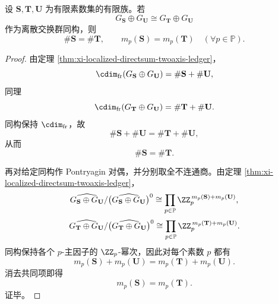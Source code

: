 \begin{corollary}[二轴账本在局部化直和族上的严格消去律]\label{cor:xi-localized-directsum-twoaxis-ledger-cancellation}
设 \(\mathbf S,\mathbf T,\mathbf U\) 为有限素数集的有限族。若
\[
G_{\mathbf S}\oplus G_{\mathbf U}\cong G_{\mathbf T}\oplus G_{\mathbf U}
\]
作为离散交换群同构，则
\[
\#\mathbf S=\#\mathbf T,
\qquad
m_p(\mathbf S)=m_p(\mathbf T)\quad(\forall p\in\mathbb P).
\]
\end{corollary}
\begin{proof}
由定理 \ref{thm:xi-localized-directsum-twoaxis-ledger}，
\[
\cdim_{\mathrm{fr}}(G_{\mathbf S}\oplus G_{\mathbf U})
=\#\mathbf S+\#\mathbf U,
\]
同理
\[
\cdim_{\mathrm{fr}}(G_{\mathbf T}\oplus G_{\mathbf U})
=\#\mathbf T+\#\mathbf U.
\]
同构保持 \(\cdim_{\mathrm{fr}}\)，故
\[
\#\mathbf S+\#\mathbf U=\#\mathbf T+\#\mathbf U,
\]
从而
\[
\#\mathbf S=\#\mathbf T.
\]

再对给定同构作 Pontryagin 对偶，并分别取全不连通商。由定理 \ref{thm:xi-localized-directsum-twoaxis-ledger}，
\[
\widehat{G_{\mathbf S}\oplus G_{\mathbf U}}/
\bigl(\widehat{G_{\mathbf S}\oplus G_{\mathbf U}}\bigr)^0
\cong
\prod_{p\in\mathbb P}\ZZ_p^{\,m_p(\mathbf S)+m_p(\mathbf U)},
\]
\[
\widehat{G_{\mathbf T}\oplus G_{\mathbf U}}/
\bigl(\widehat{G_{\mathbf T}\oplus G_{\mathbf U}}\bigr)^0
\cong
\prod_{p\in\mathbb P}\ZZ_p^{\,m_p(\mathbf T)+m_p(\mathbf U)}.
\]
同构保持各个 \(p\)-主因子的 \(\ZZ_p\)-幂次，因此对每个素数 \(p\) 都有
\[
m_p(\mathbf S)+m_p(\mathbf U)
=
m_p(\mathbf T)+m_p(\mathbf U).
\]
消去共同项即得
\[
m_p(\mathbf S)=m_p(\mathbf T).
\]
证毕。
\end{proof}

